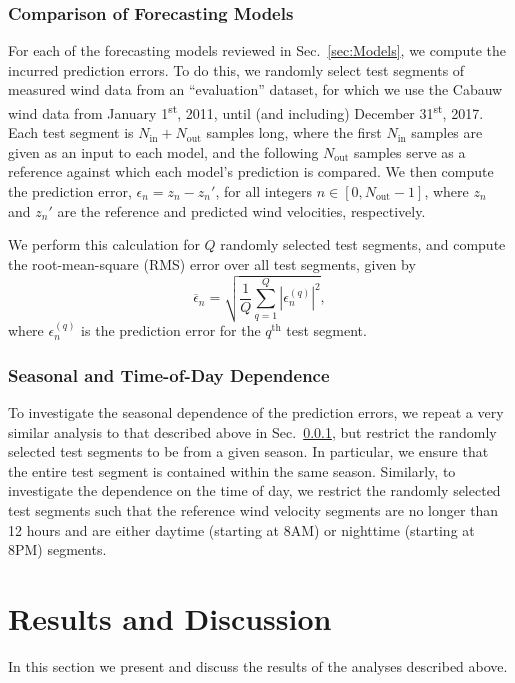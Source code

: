 \documentclass[11pt, oneside]{article}
\newcommand{\secref}[1]{Sec.~\ref{#1}}
\begin{document}
\subsubsection{Comparison of Forecasting Models}\label{sec:Methodology:Comparison}
For each of the forecasting models reviewed in \secref{sec:Models}, we compute the incurred prediction errors.
To do this, we randomly select test segments of measured wind data from an ``evaluation'' dataset, for which we use the Cabauw wind data from January 1\textsuperscript{st}, 2011, until (and including) December 31\textsuperscript{st}, 2017.
Each test segment is $N_\text{in} + N_\text{out}$ samples long, where the first $N_\text{in}$ samples are given as an input to each model, and the following $N_\text{out}$ samples serve as a reference against which each model's prediction is compared.
We then compute the prediction error, $\epsilon_n = z_n - z_n'$, for all integers $n \in [0,N_\text{out}-1]$, where $z_n$ and $z_n'$ are the reference and predicted wind velocities, respectively.

We perform this calculation for $Q$ randomly selected test segments, and compute the root-mean-square (RMS) error over all test segments, given by
\begin{equation}\label{eq:RMSError}
\overline{\epsilon}_n = \sqrt{ \frac{1}{Q} \sum_{q = 1}^Q \left| \epsilon_n^{(q)} \right|^2 },
\end{equation}
where $\epsilon_n^{(q)}$ is the prediction error for the $q^\text{th}$ test segment.

\subsubsection{Seasonal and Time-of-Day Dependence}\label{sec:Methodology:SeasonalAndDiurnalDependence}
To investigate the seasonal dependence of the prediction errors, we repeat a very similar analysis to that described above in \secref{sec:Methodology:Comparison}, but restrict the randomly selected test segments to be from a given season.
In particular, we ensure that the entire test segment is contained within the same season.
Similarly, to investigate the dependence on the time of day, we restrict the randomly selected test segments such that the reference wind velocity segments are no longer than 12 hours and are either daytime (starting at 8AM) or nighttime (starting at 8PM) segments.

\section{Results and Discussion}\label{sec:Results}
In this section we present and discuss the results of the analyses described above.
\end{document}
